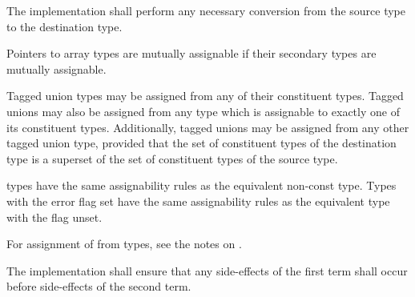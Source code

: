 The implementation shall perform any necessary conversion from the source type
to the destination type.

\specsubsubitem
Pointers to array types are mutually assignable if their secondary types are
mutually assignable.

\specsubsubitem
Tagged union types may be assigned from any of their constituent types. Tagged
unions may also be assigned from any type which is assignable to exactly one of
its constituent types. Additionally, tagged unions may be assigned from any
other tagged union type, provided that the set of constituent types of the
destination type is a superset of the set of constituent types of the source
type.

\specsubsubitem
{} types have the same assignability rules as the equivalent
non-const type. Types with the error flag set have the same assignability rules
as the equivalent type with the flag unset.


\specsubsubitem
For assignment of \terminal{*}   from
 types, see the notes on .

\specsubsubitem
The implementation shall ensure that any side-effects of the first term shall
occur before side-effects of the second term.


